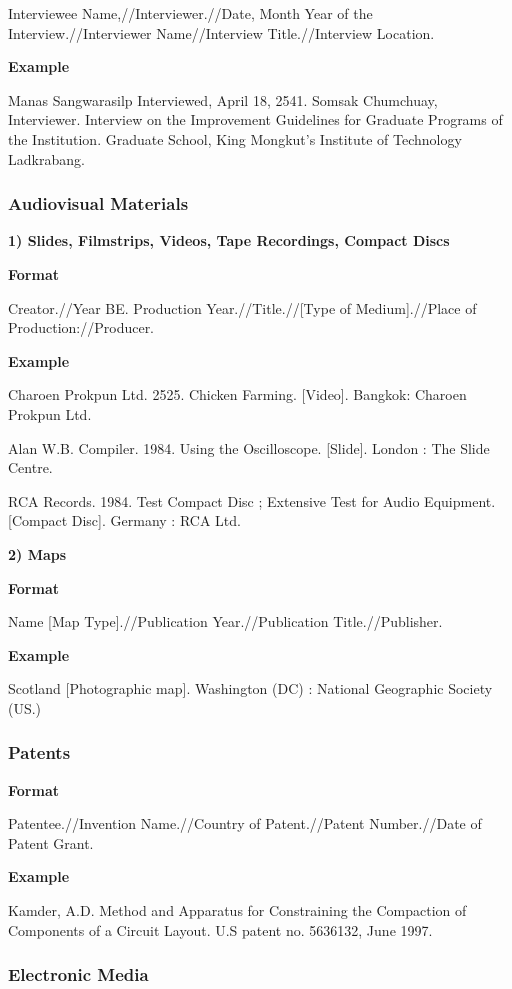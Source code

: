 Interviewee Name,//Interviewer.//Date, Month Year of the Interview.//Interviewer Name//Interview Title.//Interview Location.

\textbf{Example}

Manas Sangwarasilp Interviewed, April 18, 2541. Somsak Chumchuay, Interviewer. Interview on the Improvement Guidelines for Graduate Programs of the Institution. Graduate School, King Mongkut's Institute of Technology Ladkrabang.

\subsubsection{Audiovisual Materials}

\textbf{1) Slides, Filmstrips, Videos, Tape Recordings, Compact Discs}

\textbf{Format}

Creator.//Year BE. Production Year.//Title.//[Type of Medium].//Place of Production://Producer.

\textbf{Example}

Charoen Prokpun Ltd. 2525. Chicken Farming. [Video]. Bangkok: Charoen Prokpun Ltd.

Alan W.B. Compiler. 1984. Using the Oscilloscope. [Slide]. London : The Slide Centre.

RCA Records. 1984. Test Compact Disc ; Extensive Test for Audio Equipment. [Compact Disc]. Germany : RCA Ltd.

\textbf{2) Maps}

\textbf{Format}

Name [Map Type].//Publication Year.//Publication Title.//Publisher.

\textbf{Example}

Scotland [Photographic map]. Washington (DC) : National Geographic Society (US.)

\subsubsection{Patents}

\textbf{Format}

Patentee.//Invention Name.//Country of Patent.//Patent Number.//Date of Patent Grant.

\textbf{Example}

Kamder, A.D. Method and Apparatus for Constraining the Compaction of Components of a Circuit Layout. U.S patent no. 5636132, June 1997.

\subsubsection{Electronic Media}

